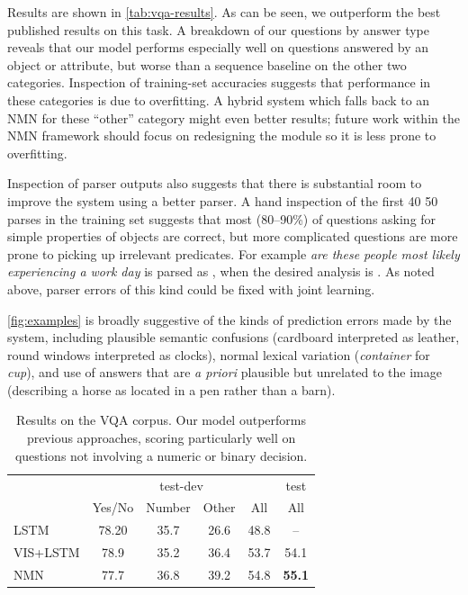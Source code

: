 Results are shown in \autoref{tab:vqa-results}. As can be seen, we outperform the best published
results on this task. A breakdown of our questions by answer type reveals that
our model performs especially well on questions answered by an object or
attribute, but worse than a sequence baseline on the other two categories.
Inspection of training-set accuracies suggests that performance in these
categories is due to overfitting. A hybrid system which falls back to an NMN for
these ``other'' category might even better results; future work within the NMN
framework should focus on redesigning the  module so it
is less prone to overfitting.

Inspection of parser outputs also suggests that there is substantial room to
improve the system using a better parser. A hand inspection of the first 40
50 parses in the training set suggests that most (80--90\%) of questions asking
for simple properties of objects are correct, but more complicated questions are
more prone to picking up irrelevant predicates. For example \emph{are these
people most likely experiencing a work day} is parsed as , when the desired analysis is . As noted above,
parser errors of this kind could be fixed with joint learning.

\autoref{fig:examples} is broadly suggestive of the kinds of prediction errors made by the
system, including plausible semantic confusions (cardboard interpreted as
leather, round windows interpreted as clocks), normal lexical variation
(\emph{container} for \emph{cup}), and use of answers that are \emph{a priori}
plausible but unrelated to the image (describing a horse as located in a pen
rather than a barn).

\begin{table}
  \footnotesize
  \center
  \begin{tabular}{lccccc}
    \toprule
    & \multicolumn{4}{c}{test-dev} & test \\
    \cmidrule(lr){2-5} \cmidrule(lr){6-6}
    & Yes/No & Number & Other & All & All \\
    \midrule
    LSTM & 78.20 & 35.7 & 26.6 & 48.8 & -- \\
    VIS+LSTM & 78.9 & 35.2 & 36.4 & 53.7 & 54.1 \\
    NMN & 77.7 & 36.8 & 39.2 & 54.8 & \bf 55.1 \\
    \bottomrule
  \end{tabular}
  \caption{Results on the VQA corpus. Our model outperforms previous approaches,
    scoring particularly well on questions not involving a numeric or binary
    decision.}
    \label{tab:vqa-results}
\end{table}

